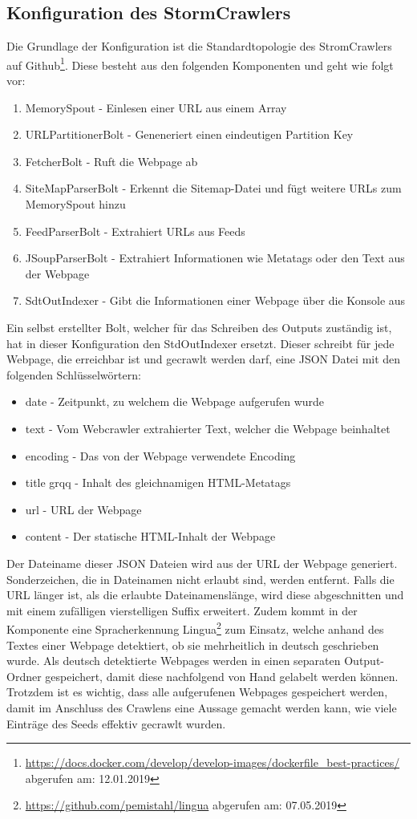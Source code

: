 \subsection{Konfiguration des StormCrawlers}
Die Grundlage der Konfiguration ist die Standardtopologie des StromCrawlers auf Github\footnote{\url{https://docs.docker.com/develop/develop-images/dockerfile_best-practices/} abgerufen am: 12.01.2019}.
Diese besteht aus den folgenden Komponenten und geht wie folgt vor:
\begin{enumerate}
	\item MemorySpout - Einlesen einer URL aus einem Array
	\item URLPartitionerBolt - Geneneriert einen eindeutigen Partition Key
	\item FetcherBolt - Ruft die Webpage ab
	\item SiteMapParserBolt - Erkennt die Sitemap-Datei und fügt weitere URLs zum MemorySpout hinzu
	\item FeedParserBolt - Extrahiert URLs aus Feeds
	\item JSoupParserBolt - Extrahiert Informationen wie Metatags oder den Text aus der Webpage
	\item SdtOutIndexer - Gibt die Informationen einer Webpage über die Konsole aus
\end{enumerate}
Ein selbst erstellter Bolt, welcher für das Schreiben des Outputs zuständig ist, hat in dieser Konfiguration den StdOutIndexer ersetzt.
Dieser schreibt für jede Webpage, die erreichbar ist und gecrawlt werden darf, eine JSON Datei mit den folgenden Schlüsselwörtern:
\begin{itemize}
	\item \glqq date\grqq{} - Zeitpunkt, zu welchem die Webpage aufgerufen wurde
	\item \glqq text\grqq{} - Vom Webcrawler extrahierter Text, welcher die Webpage beinhaltet
	\item \glqq encoding\grqq{} - Das von der Webpage verwendete Encoding
	\item \glqq title grqq{} - Inhalt des gleichnamigen HTML-Metatags
	\item \glqq url\grqq{} - URL der Webpage
	\item \glqq content\grqq{} - Der statische HTML-Inhalt der Webpage	
\end{itemize}
Der Dateiname dieser JSON Dateien wird aus der URL der Webpage generiert. 
Sonderzeichen, die in Dateinamen nicht erlaubt sind, werden entfernt. Falls die URL länger ist, als die erlaubte Dateinamenslänge, wird diese abgeschnitten und mit einem zufälligen vierstelligen Suffix erweitert.
Zudem kommt in der Komponente eine Spracherkennung \glqq Lingua\footnote{\url{https://github.com/pemistahl/lingua} abgerufen am: 07.05.2019}\grqq{} zum Einsatz, welche anhand des Textes einer Webpage detektiert, ob sie mehrheitlich in deutsch geschrieben wurde.
Als deutsch detektierte Webpages werden in einen separaten Output-Ordner gespeichert, damit diese nachfolgend von Hand gelabelt werden können.
Trotzdem ist es wichtig, dass alle aufgerufenen Webpages gespeichert werden, damit im Anschluss des Crawlens eine Aussage gemacht werden kann, wie viele Einträge des Seeds effektiv gecrawlt wurden.
